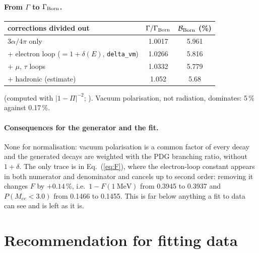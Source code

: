 \documentclass[11pt]{article}
\newcommand{\Mee}{M_{ee}}
\begin{document}
\paragraph{From $\Gamma$ to $\Gamma_{\rm Born}$.}

\begin{center}
\begin{tabular}{lcc}\toprule
corrections divided out & $\Gamma/\Gamma_{\rm Born}$ & $\mathcal B_{\rm Born}$ (\%)\\\midrule
$3\alpha/4\pi$ only               & 1.0017 & 5.961\\
$+$ electron loop ($=1+\delta(E)$, \texttt{delta\_vm}) & 1.0266 & 5.816\\
$+$ $\mu$, $\tau$ loops           & 1.0332 & 5.779\\
$+$ hadronic (estimate)           & 1.052  & 5.68\\\bottomrule
\end{tabular}
\end{center}
(computed with $|1-\Pi|^{-2}$; ).  Vacuum
polarisation, not radiation, dominates: 5\,\% against 0.17\,\%.

\paragraph{Consequences for the generator and the fit.}
None for normalisation: vacuum polarisation is a common factor of every decay and the
generated decays are weighted with the PDG branching ratio, without $1+\delta$.  The
only trace is in Eq.~(\ref{eq:F}), where the electron-loop constant appears in both
numerator and denominator and cancels up to second order: removing it changes
$F$ by $+0.14\,\%$, i.e.\ $1-F(1~\text{MeV})$ from 0.3945 to 0.3937 and
$P(\Mee<3.0)$ from 0.1466 to 0.1455.  This is far below anything a fit to data can
see and is left as it is.

\section{Recommendation for fitting data}
\end{document}
